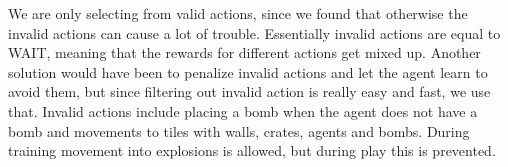 
We are only selecting from valid actions, since we found that otherwise the invalid actions can cause a lot of trouble. Essentially invalid actions are equal to WAIT, meaning that the rewards for different actions get mixed up.
Another solution would have been to penalize invalid actions and let the agent learn to avoid them, but since filtering out invalid action is really easy and fast, we use that.
Invalid actions include placing a bomb when the agent does not have a bomb and movements to tiles with walls, crates, agents and bombs. During training movement into explosions is allowed, but during play this is prevented.
